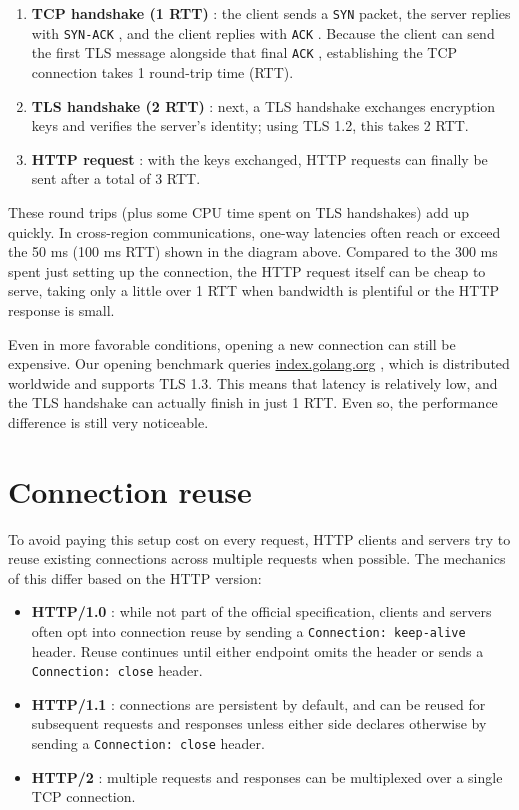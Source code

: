 \documentclass[11pt,a4paper]{article}
\begin{document}
\begin{enumerate}
\item \textbf{TCP handshake (1 RTT)} : the client sends a \texttt{SYN} packet, the server replies with \texttt{SYN-ACK} , and the client replies with \texttt{ACK} . Because the client can send the first TLS message alongside that final \texttt{ACK} , establishing the TCP connection takes 1 round-trip time (RTT).
\item \textbf{TLS handshake (2 RTT)} : next, a TLS handshake exchanges encryption keys and verifies the server's identity; using TLS 1.2, this takes 2 RTT.
\item \textbf{HTTP request} : with the keys exchanged, HTTP requests can finally be sent after a total of 3 RTT.
\end{enumerate}

These round trips (plus some CPU time spent on TLS handshakes) add up quickly. In cross-region communications, one-way latencies often reach or exceed the 50 ms (100 ms RTT) shown in the diagram above. Compared to the 300 ms spent just setting up the connection, the HTTP request itself can be cheap to serve, taking only a little over 1 RTT when bandwidth is plentiful or the HTTP response is small.

Even in more favorable conditions, opening a new connection can still be expensive. Our opening benchmark queries \href{https://index.golang.org/}{index.golang.org} , which is distributed worldwide and supports TLS 1.3. This means that latency is relatively low, and the TLS handshake can actually finish in just 1 RTT. Even so, the performance difference is still very noticeable.

\section{Connection reuse}

To avoid paying this setup cost on every request, HTTP clients and servers try to reuse existing connections across multiple requests when possible. The mechanics of this differ based on the HTTP version:

\begin{itemize}
\item \textbf{HTTP/1.0} : while not part of the official specification, clients and servers often opt into connection reuse by sending a \texttt{Connection: keep-alive} header. Reuse continues until either endpoint omits the header or sends a \texttt{Connection: close} header.
\item \textbf{HTTP/1.1} : connections are persistent by default, and can be reused for subsequent requests and responses unless either side declares otherwise by sending a \texttt{Connection: close} header.
\item \textbf{HTTP/2} : multiple requests and responses can be multiplexed over a single TCP connection.
\end{itemize}
\end{document}
